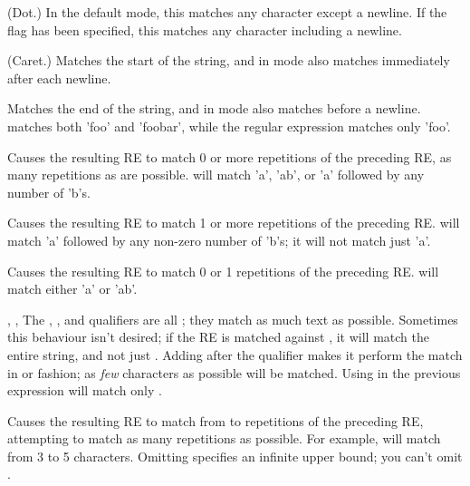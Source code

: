 \begin{list}{}{\leftmargin \MyLeftMargin {} \MyLabelWidth}

\item[\character{.}] (Dot.)  In the default mode, this matches any
character except a newline.  If the  flag has been
specified, this matches any character including a newline.

\item[\character{\^}] (Caret.)  Matches the start of the string, and in
 mode also matches immediately after each newline.

\item[\character{\$}] Matches the end of the string, and in
 mode also matches before a newline.
 matches both 'foo' and 'foobar', while the regular
expression  matches only 'foo'.

\item[\character{*}] Causes the resulting RE to
match 0 or more repetitions of the preceding RE, as many repetitions
as are possible.   will
match 'a', 'ab', or 'a' followed by any number of 'b's.

\item[\character{+}] Causes the
resulting RE to match 1 or more repetitions of the preceding RE.
 will match 'a' followed by any non-zero number of 'b's; it
will not match just 'a'.

\item[\character{?}] Causes the resulting RE to
match 0 or 1 repetitions of the preceding RE.   will
match either 'a' or 'ab'.
\item[\code{*?}, \code{+?}, \code{??}] The \character{*}, \character{+}, and
 qualifiers are all ; they match as much text as
possible.  Sometimes this behaviour isn't desired; if the RE
 is matched against , it will match the
entire string, and not just .
Adding  after the qualifier makes it perform the match in
 or  fashion; as \emph{few} characters as
possible will be matched.  Using  in the previous
expression will match only .

\item[\code{\{\var{m},\var{n}\}}] Causes the resulting RE to match from
 to  repetitions of the preceding RE, attempting to
match as many repetitions as possible.  For example, 
will match from 3 to 5  characters.  Omitting 
specifies an infinite upper bound; you can't omit .


\end{list}
